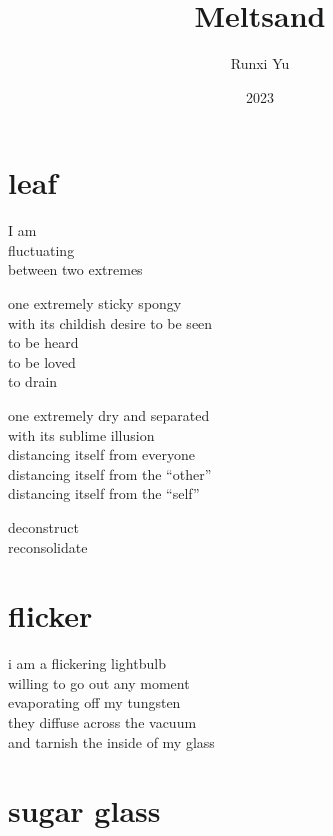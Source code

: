 \documentclass[parskip=full,12pt,oneside,a5paper]{scrbook}
\begin{document}
\title{Meltsand}
\author{Runxi Yu}
\date{2023}
\maketitle
\tableofcontents

\chapter{leaf}

I am\\
\hphantom{I am} fluctuating\\
\hphantom{I am fluctuating} between two extremes

one extremely sticky spongy\\
\hspace*{2em}with its childish desire to be seen\\
\hspace*{4em}to be heard\\
\hspace*{6em}to be loved\\
\hspace*{8em}to drain

one extremely dry and separated\\
\hspace*{2em}with its sublime illusion\\
\hspace*{4em}distancing itself from everyone\\
\hspace*{6em}distancing itself from the ``other''\\
\hspace*{8em}distancing itself from the ``self''

deconstruct\\
reconsolidate

\chapter{flicker}

i am a flickering lightbulb\\
willing to go out any moment\\
evaporating off my tungsten\\
they diffuse across the vacuum\\
and tarnish the inside of my glass

\chapter{sugar glass}
\end{document}
